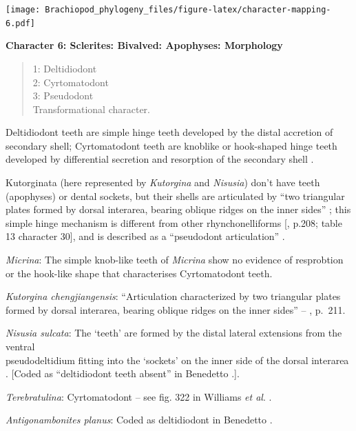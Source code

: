 \documentclass[]{book}
\theoremstyle{definition}
\theoremstyle{definition}
\theoremstyle{definition}
\theoremstyle{remark}
\begin{document}
\texttt{[image: Brachiopod\_phylogeny\_files/figure-latex/character-mapping-6.pdf]}

\textbf{Character 6: Sclerites: Bivalved: Apophyses: Morphology}

\begin{quote}
1: Deltidiodont\\
2: Cyrtomatodont\\
3: Pseudodont\\
Transformational character.
\end{quote}

Deltidiodont teeth are simple hinge teeth developed by the distal
accretion of secondary shell; Cyrtomatodont teeth are knoblike or
hook-shaped hinge teeth developed by differential secretion and
resorption of the secondary shell \citep[fig. 322
in][]{Williams2000BrachiopodaLinguliformea}.

Kutorginata (here represented by \emph{Kutorgina} and \emph{Nisusia})
don't have teeth (apophyses) or dental sockets, but their shells are
articulated by ``two triangular plates formed by dorsal interarea,
bearing oblique ridges on the inner sides''
\citep[p.~211]{Williams2000BrachiopodaLinguliformea}; this simple hinge
mechanism is different from other rhynchonelliforms
{[}\citet{Williams2000BrachiopodaLinguliformea}, p.208; table 13
character 30{]}, and is described as a ``pseudodont articulation''
\citep{Holmer2018Evolutionarysignificance}.

\emph{Micrina}: The simple knob-like teeth of \emph{Micrina} show no
evidence of resprobtion or the hook-like shape that characterises
Cyrtomatodont teeth.

\emph{Kutorgina chengjiangensis}: ``Articulation characterized by two
triangular plates formed by dorsal interarea, bearing oblique ridges on
the inner sides'' -- \citet{Williams2000BrachiopodaLinguliformea},
p.~211.

\emph{Nisusia sulcata}: The `teeth' are formed by the distal lateral
extensions from the ventral\\
pseudodeltidium fitting into the `sockets' on the inner side of the
dorsal interarea \citep{Holmer2018Evolutionarysignificance}. {[}Coded as
``deltidiodont teeth absent'' in Benedetto
\citeyearpar{Benedetto2009iChaniella}.{]}.

\emph{Terebratulina}: Cyrtomatodont -- see fig. 322 in Williams \emph{et
al}. \citeyearpar{Williams2000BrachiopodaLinguliformea}.

\emph{Antigonambonites planus}: Coded as deltidiodont in Benedetto
\citeyearpar{Benedetto2009iChaniella}.
\end{document}
